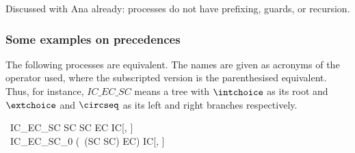 \documentclass{article}
\begin{document}


\begin{issue}
    Discussed with Ana already: processes do not have prefixing, guards, or recursion.
\end{issue}

\subsubsection{Some examples on precedences}

The following processes are equivalent. The names are given as acronyms of
the operator used, where the subscripted version is the parenthesised equivalent.
Thus, for instance, $IC\_EC\_SC$ means a tree with $\intchoice$ as its root and
$\extchoice$ and $\circseq$ as its left and right branches respectively.
%
\begin{circus}
    \circprocess\ IC\_EC\_SC   \circdef SC \circseq SC \extchoice EC \intchoice IC[\nat, \nat] \\
    \circprocess\ IC\_EC\_SC_0 \circdef (~(SC \circseq SC) \extchoice EC) \intchoice IC[\nat, \nat]
\end{circus}
%
\end{document}
